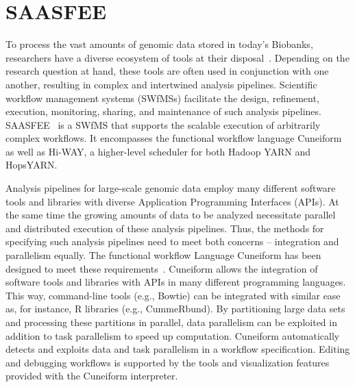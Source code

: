 \section{SAASFEE}
\label{saasfee}


To process the vast amounts of genomic data stored in today's Biobanks, researchers have a diverse ecosystem of tools at their disposal~\cite{Pabinger2014}. Depending on the research question at hand, these tools are often used in conjunction with one another, resulting in complex and intertwined analysis pipelines. Scientific workflow management systems (SWfMSs) facilitate the design, refinement, execution, monitoring, sharing, and maintenance of such analysis pipelines. SAASFEE~\cite{vldb_demo} is a SWfMS that supports the scalable execution of arbitrarily complex workflows. It encompasses the functional workflow language Cuneiform as well as Hi-WAY, a higher-level scheduler for both Hadoop YARN and HopsYARN.

Analysis pipelines for large-scale genomic data employ many different software tools and libraries with diverse Application Programming Interfaces (APIs). At the same time the growing amounts of data to be analyzed necessitate parallel and distributed execution of these analysis pipelines. Thus, the methods for specifying such analysis pipelines need to meet both concerns -- integration and parallelism equally. The functional workflow Language Cuneiform has been designed to meet these requirements~\cite{Brandt2015}. Cuneiform allows the integration of software tools and libraries with APIs in many different programming languages. This way, command-line tools (e.g., Bowtie) can be integrated with similar ease as, for instance, R libraries (e.g., CummeRbund). By partitioning large data sets and processing these partitions in parallel, data parallelism can be exploited in addition to task parallelism to speed up computation. Cuneiform automatically detects and exploits data and task parallelism in a workflow specification. Editing and debugging workflows is supported by the tools and visualization features provided with the Cuneiform interpreter.


